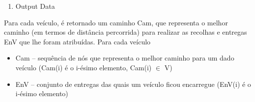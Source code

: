 \documentclass[12pt]{article}
\renewcommand{\_}{\kern-1.5pt\textunderscore\kern-1.5pt}
\begin{document}
\vspace{\baselineskip}

\vspace{\baselineskip}

\vspace{\baselineskip}

\vspace{\baselineskip}

\vspace{\baselineskip}

\vspace{\baselineskip}
\begin{enumerate}[label*={\fontsize{16pt}{16pt}\selectfont \arabic*.}]
	\item {\fontsize{16pt}{19.2pt}\selectfont Output Data}
\end{enumerate}
Para cada veículo, é retornado um caminho Cam, que representa o melhor caminho (em termos de distância percorrida) para realizar as recolhas e entregas EnV que lhe foram atribuídas.
Para cada veículo
\begin{itemize}
	\item Cam – sequência de nós que representa o melhor caminho para um dado veículo (Cam(i) é o i-ésimo elemento, Cam(i) $ \in $  V)
\end{itemize}
\begin{itemize}
	\item EnV – conjunto de entregas das quais um veículo ficou encarregue (EnV(i) é o i-ésimo elemento)
\end{itemize}

\vspace{\baselineskip}

\vspace{\baselineskip}
\printbibliography
\end{document}
